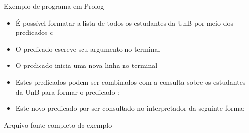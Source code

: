 \begin{frame}[fragile]{Exemplo de programa em Prolog}

    \begin{itemize}
        \item É possível formatar a lista de todos os estudantes da UnB por meio dos 
            predicados  e 

        \item O predicado  escreve seu argumento no terminal

        \item O predicado  inicia uma nova linha no terminal

        \item Estes predicados podem ser combinados com a consulta sobre os estudantes da
            UnB para formar o predicado :


        \item Este novo predicado por ser consultado no interpretador da seguinte forma:


    \end{itemize}

\end{frame}

\begin{frame}[fragile]{Arquivo-fonte completo do exemplo}


\end{frame}

